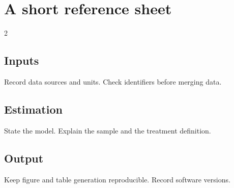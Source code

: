 \documentclass{article}
\begin{document}
\section{A short reference sheet}
\begin{multicols}{2}
\subsection*{Inputs}Record data sources and units. Check identifiers before merging data.
\subsection*{Estimation}State the model. Explain the sample and the treatment definition.
\subsection*{Output}Keep figure and table generation reproducible. Record software versions.
\end{multicols}
\end{document}
